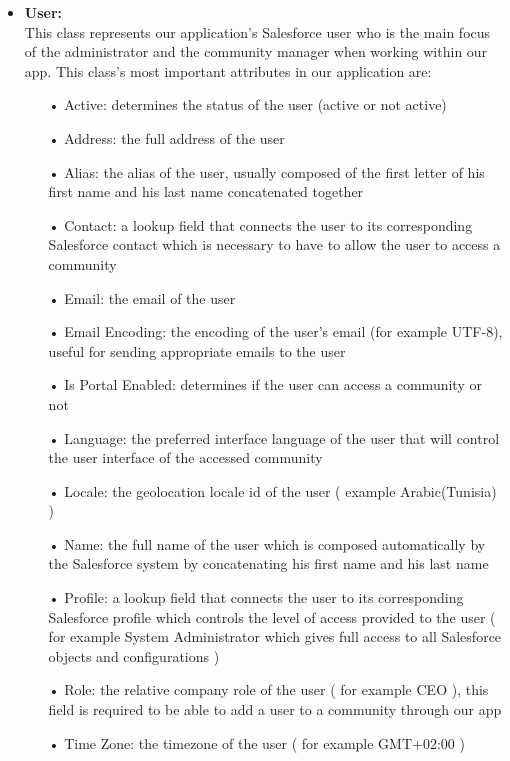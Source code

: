 \begin{itemize}
\item \textbf{User:}\\
This class represents our application's Salesforce user who is the main focus of the administrator and the community manager when working within our app. This class's most important attributes in our application are:
\begin{itemize}
\item[•] Active: determines the status of the user (active or not active)
\item[•] Address: the full address of the user
\item[•] Alias: the alias of the user, usually composed of the first letter of his first name and his last name concatenated together
\item[•] Contact: a lookup field that connects the user to its corresponding Salesforce contact which is necessary to have to allow the user to access a community
\item[•] Email: the email of the user
\item[•] Email Encoding: the encoding of the user's email (for example UTF-8), useful for sending appropriate emails to the user
\item[•] Is Portal Enabled: determines if the user can access a community or not
\item[•] Language: the preferred interface language of the user that will control the user interface of the accessed community
\item[•] Locale: the geolocation locale id of the user ( example Arabic(Tunisia) )
\item[•] Name: the full name of the user which is composed automatically by the Salesforce system by concatenating his first name and his last name
\item[•] Profile: a lookup field that connects the user to its corresponding Salesforce profile which controls the level of access provided to the user ( for example System Administrator which gives full access to all Salesforce objects and configurations )
\item[•] Role: the relative company role of the user ( for example CEO ), this field is required to be able to add a user to a community through our app
\item[•] Time Zone: the timezone of the user ( for example GMT+02:00 )

\end{itemize}
\end{itemize}
